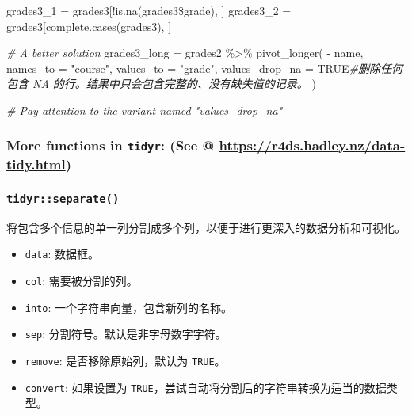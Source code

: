 \documentclass[
]{article}
\newenvironment{Shaded}{}{}
\newcommand{\AttributeTok}[1]{\textcolor[rgb]{0.49,0.56,0.16}{#1}}
\newcommand{\CommentTok}[1]{\textcolor[rgb]{0.38,0.63,0.69}{\textit{#1}}}
\newcommand{\FunctionTok}[1]{\textcolor[rgb]{0.02,0.16,0.49}{#1}}
\newcommand{\NormalTok}[1]{#1}
\newcommand{\OtherTok}[1]{\textcolor[rgb]{0.00,0.44,0.13}{#1}}
\newcommand{\SpecialCharTok}[1]{\textcolor[rgb]{0.25,0.44,0.63}{#1}}
\newcommand{\StringTok}[1]{\textcolor[rgb]{0.25,0.44,0.63}{#1}}
\begin{document}
\begin{Shaded}
\begin{Highlighting}[]
\NormalTok{grades3\_1 }\OtherTok{=}
\NormalTok{	grades3[}\SpecialCharTok{!}\FunctionTok{is.na}\NormalTok{(grades3}\SpecialCharTok{\$}\NormalTok{grade), ]}
\NormalTok{grades3\_2 }\OtherTok{=}
\NormalTok{	grades3[}\FunctionTok{complete.cases}\NormalTok{(grades3), ]}

\CommentTok{\# A better solution}
\NormalTok{grades3\_long }\OtherTok{=}\NormalTok{ grades2 }\SpecialCharTok{\%\textgreater{}\%} 
  \FunctionTok{pivot\_longer}\NormalTok{( }\SpecialCharTok{{-}}\NormalTok{ name, }
                \AttributeTok{names\_to =} \StringTok{"course"}\NormalTok{, }
                \AttributeTok{values\_to =} \StringTok{"grade"}\NormalTok{,}
                 \AttributeTok{values\_drop\_na =}\NormalTok{ TRUE}\CommentTok{\#删除任何包含 NA 的行。结果中只会包含完整的、没有缺失值的记录。}
\NormalTok{              )}

\CommentTok{\# Pay attention to the variant named "values\_drop\_na"}
\end{Highlighting}
\end{Shaded}

\hypertarget{more-functions-in-tidyr-see--httpsr4dshadleynzdata-tidyhtml}{%
\subsubsection{\texorpdfstring{More functions in \texttt{tidyr}: (See @
\url{https://r4ds.hadley.nz/data-tidy.html})}{More functions in tidyr: (See @ https://r4ds.hadley.nz/data-tidy.html)}}\label{more-functions-in-tidyr-see--httpsr4dshadleynzdata-tidyhtml}}

\hypertarget{tidyrseparate}{%
\subsubsection{\texorpdfstring{\texttt{tidyr::separate()}}{tidyr::separate()}}\label{tidyrseparate}}

将包含多个信息的单一列分割成多个列，以便于进行更深入的数据分析和可视化。

\begin{itemize}
\item
  \texttt{data}: 数据框。
\item
  \texttt{col}: 需要被分割的列。
\item
  \texttt{into}: 一个字符串向量，包含新列的名称。
\item
  \texttt{sep}: 分割符号。默认是非字母数字字符。
\item
  \texttt{remove}: 是否移除原始列，默认为 \texttt{TRUE}。
\item
  \texttt{convert}: 如果设置为
  \texttt{TRUE}，尝试自动将分割后的字符串转换为适当的数据类型。
\end{itemize}
\end{document}
